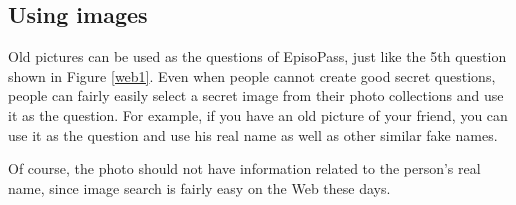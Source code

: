 \documentclass{sigchi}
\begin{document}
\subsection{Using images}

Old pictures can be used as the questions of EpisoPass,
just like the 5th question shown in Figure \ref{web1}.
Even when people cannot create good secret questions,
people can fairly easily select a secret image from their photo collections
and use it as the question.
For example, if you have an old picture of your friend,
you can use it as the question
and use his real name as well as other similar fake names.


Of course, the photo should not have information related to the
person's real name, since image search is fairly easy on the Web these days.



% 
% 
% 
%
\end{document}
